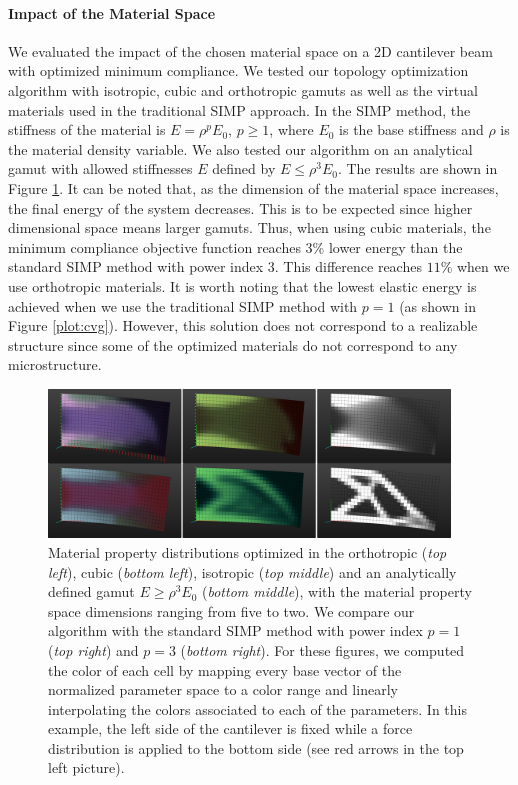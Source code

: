 \paragraph{Impact of the Material Space}
We evaluated the impact of the chosen material space on a 2D cantilever beam with optimized minimum compliance.
We tested our topology optimization algorithm with isotropic, cubic and orthotropic gamuts as well as the virtual materials used in the traditional SIMP approach.
In the SIMP method, the stiffness of the material is $E=\rho^p E_0$, $p \geq 1$, where $E_0$ is the base stiffness and $\rho$ is the material density variable.
We also tested our algorithm on an analytical gamut with allowed stiffnesses $E$ defined by $E\leq \rho^3 E_0$.
The results are shown in Figure \ref{fig:defo_cvg}.
It can be noted that, as the dimension of the material space increases, the final energy of the system decreases. This is to be expected since higher dimensional space means larger gamuts.
Thus, when using cubic materials, the minimum compliance objective function reaches 3\% lower energy than the standard SIMP method with power index 3.
This difference reaches $11\%$ when we use orthotropic materials.
It is worth noting that the lowest elastic energy is achieved when we use the traditional SIMP method with $p=1$ (as shown in Figure \ref{plot:cvg}).
However, this solution does not correspond to a realizable structure since some of the optimized materials do not correspond to any microstructure.
\begin{figure}
	\centering
	\includegraphics[width=0.95\textwidth]{images/cantilever.png}
	\caption{Material property distributions optimized in the orthotropic (\emph{top left}), cubic (\emph{bottom left}), isotropic (\emph{top middle}) and an analytically defined gamut $E \geq \rho^3 E_0$ (\emph{bottom middle}), with the material property space dimensions ranging from five to two. 
		We compare our algorithm with the standard SIMP method with power index $p=1$ (\emph{top right}) and $p=3$ (\emph{bottom right}). For these figures, we computed the color of each cell by mapping every base vector of the normalized parameter space to a color range and linearly interpolating the colors associated to each of the parameters.
		In this example, the left side of the cantilever is fixed while a force distribution is applied to the bottom side (see red arrows in the top left picture).}
	\label{fig:defo_cvg}
\end{figure}

